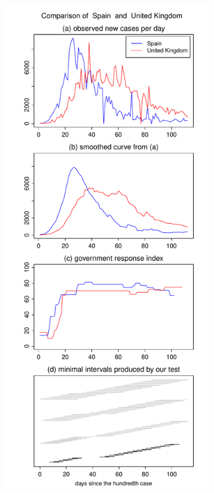 \documentclass[a4paper,12pt]{article}
\numberwithin{equation}{section}
\begin{document}
\begin{figure}[t!]
\begin{subfigure}[b]{0.475\textwidth}
\end{subfigure}\hspace{0.55cm}
\begin{subfigure}[b]{0.475\textwidth}
\includegraphics[width=\textwidth]{plots/ESP_vs_GBR}
\end{subfigure}
\end{figure}
\end{document}
